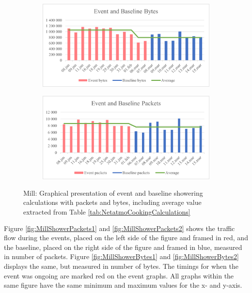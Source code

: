 \begin{figure}[H]
    \centering
    \begin{subfigure}{0.8\textwidth}
        \centering
        \includegraphics[width=1\hsize]{figures/Mill_Shower_Calculations_Bytes.png} 
    \end{subfigure}
    \begin{subfigure}{0.8\textwidth}
        \centering
        \includegraphics[width=1\hsize]{figures/Mill_Shower_Calculations_Packets.png} 
    \end{subfigure}
    \caption{Mill: Graphical presentation of event and baseline showering calculations with packets and bytes, including average value extracted from Table \ref{tab:NetatmoCookingCalculations}}
    \label{fig:MillShowerCalculations}
\end{figure}

Figure \ref{fig:MillShowerPackets1} and \ref{fig:MillShowerPackets2} shows the traffic flow during the events, placed on the left side of the figure and framed in red, and the baseline, placed on the right side of the figure and framed in blue, measured in number of packets. Figure \ref{fig:MillShowerBytes1} and \ref{fig:MillShowerBytes2} displays the same, but measured in number of bytes. The timings for when the event was ongoing are marked red on the event graphs. All graphs within the same figure have the same minimum and maximum values for the x- and y-axis. 

